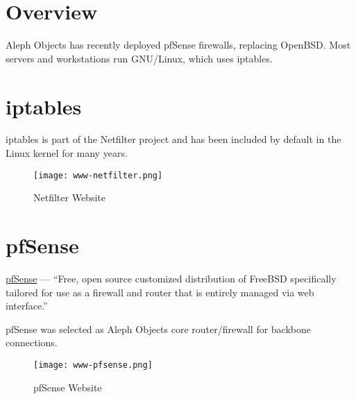 %
%
%
%
%

\section{Overview}
Aleph Objects has recently deployed pfSense firewalls, replacing OpenBSD.
Most servers and workstations run GNU/Linux, which uses iptables.


\section{iptables}
iptables is part of the Netfilter project and has been included by default in
the Linux kernel for many years.

\begin{figure}[h!]
\texttt{[image: www-netfilter.png]}
 \caption{Netfilter Website}
 \label{fig:www-netfilter}
\end{figure}


\section{pfSense}
\href{https://www.pfsense.org/}{pfSense} --- ``Free, open source customized
distribution of FreeBSD specifically tailored for use as a firewall and router
that is entirely managed via web interface.''

pfSense was selected as Aleph Objects core router/firewall for backbone
connections.

\begin{figure}[h!]
\texttt{[image: www-pfsense.png]}
 \caption{pfSense Website}
 \label{fig:www-pfsense}
\end{figure}

